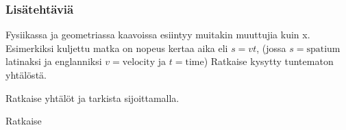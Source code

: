 \begin{tehtavasivu}
\subsubsection*{Lisätehtäviä}

\begin{tehtava}
Fysiikassa ja geometriassa kaavoissa esiintyy muitakin muuttujia kuin x.
Esimerkiksi kuljettu matka on nopeus kertaa aika eli $s=vt$, (jossa
$s= \text{spatium}$ latinaksi ja englanniksi $v= \text{velocity}$ ja $t=\text{time}$)
Ratkaise kysytty tuntematon yhtälöstä.

\begin{alakohdat}
% 
\end{alakohdat}
\begin{vastaus}
\begin{alakohdat}
\end{alakohdat}
\end{vastaus}
\end{tehtava}

\begin{tehtava}
Ratkaise yhtälöt ja tarkista sijoittamalla.
\begin{alakohdat}
\end{alakohdat}
%
\begin{vastaus}
\begin{alakohdat}
\end{alakohdat}
\end{vastaus}
\end{tehtava}

\begin{tehtava}
Ratkaise
\begin{alakohdat}
\end{alakohdat}


\end{tehtava}
\end{tehtavasivu}
